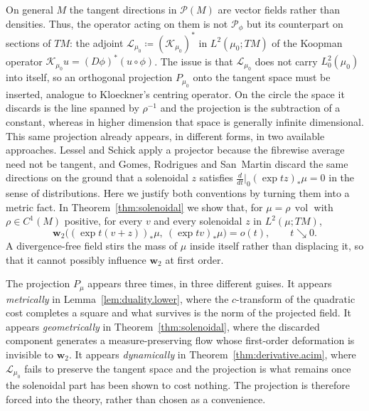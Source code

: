 \documentclass[11pt,reqno]{amsart}
\theoremstyle{plain}
\theoremstyle{definition}
\newcommand{\dw}{\mathbf{w}_2}
\newcommand{\Prob}{\mathcal{P}}
\newcommand{\Koop}{\mathcal{K}}
\newcommand{\Transf}{\mathcal{L}}
\newcommand{\PF}{\mathcal{P}}
\DeclareMathOperator{\vol}{vol}
\begin{document}
On general \(M\) the tangent directions in \(\Prob(M)\) are vector fields rather than densities.
Thus, the operator acting on them is not \( \PF_\phi \) but its counterpart on sections of \( TM \): the adjoint \( \Transf_{\mu_0}\coloneqq(\Koop_{\mu_0})^\ast \) in \( L^2(\mu_0;TM) \) of the Koopman operator \( \Koop_{\mu_0}u=(D\phi)^\ast(u\circ\phi) \).
The issue is that \( \Transf_{\mu_0} \) does not carry \( L^2_0(\mu_0) \) into itself, so an orthogonal projection \( P_{\mu_0} \) onto the tangent space must be inserted, analogue to Kloeckner's centring operator.
On the circle the space it discards is the line spanned by \( \rho^{-1} \) and the projection is the subtraction of a constant, whereas in higher dimension that space is generally infinite dimensional.
This same projection already appears, in different forms, in two available approaches.
Lessel and Schick \cite{lessel_differentiable_2020} apply a projector because the fibrewise average need not be tangent, and Gomes, Rodrigues and San~Martin \cite[\S3]{gomes_differential_2024} discard the same directions on the ground that a solenoidal \( z \) satisfies \( \frac{d}{dt}\big|_{0}(\exp tz)_\ast\mu=0 \) in the sense of distributions.
Here we justify both conventions by turning them into a metric fact.
In Theorem~\ref{thm:solenoidal} we show that, for \( \mu=\rho\,\vol \) with \( \rho\in C^1(M) \) positive, for every \( v \) and every solenoidal \( z \) in \( L^2(\mu;TM) \),
\[
    \dw\big((\exp t(v+z))_\ast\mu,\ (\exp tv)_\ast\mu\big)=o(t),\qquad t\searrow0 .
\]
A divergence-free field stirs the mass of \( \mu \) inside itself rather than displacing it, so that it cannot possibly influence \( \dw \) at first order.

The projection \(P_\mu\) appears three times, in three different guises.
It appears \emph{metrically} in Lemma~\ref{lem:duality.lower}, where the \(c\)-transform of the quadratic cost completes a square and what survives is the norm of the projected field. 
It appears \emph{geometrically} in Theorem~\ref{thm:solenoidal}, where the discarded component generates a measure-preserving flow whose first-order deformation is invisible to \(\dw\). 
It appears \emph{dynamically} in Theorem~\ref{thm:derivative.acim}, where \(\Transf_{\mu_0}\) fails to preserve the tangent space and the projection is what remains once the solenoidal part has been shown to cost nothing. 
The projection is therefore forced into the theory, rather than chosen as a convenience.
\end{document}
